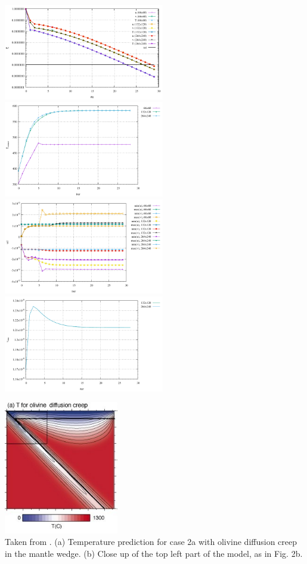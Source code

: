 \begin{center}
\includegraphics[width=7cm]{python_codes/fieldstone_68/results/case2a/conv.pdf}
\includegraphics[width=7cm]{python_codes/fieldstone_68/results/case2a/stats_Tcorner.pdf}\\
\includegraphics[width=7cm]{python_codes/fieldstone_68/results/case2a/stats_uv.pdf}
\includegraphics[width=7cm]{python_codes/fieldstone_68/results/case2a/vrms.pdf}
\end{center}


\begin{center}
\includegraphics[width=5cm]{python_codes/fieldstone_68/images/fig4}\\
{\captionfont Taken from \cite{vack08}. 
(a) Temperature prediction for case 2a with olivine diffusion creep in 
the mantle wedge. (b) Close up of the top left part of the model, as in Fig. 2b.}
\end{center}

